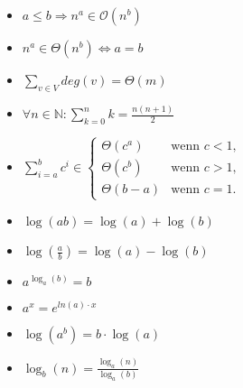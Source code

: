 \documentclass[11pt, a4paper, twoside]{article}
\begin{document}
\begin{multicols}{3}
    \begin{itemize}
        \item $a \leq b \Rightarrow n^a \in \mathcal{O}(n^b)$
        \item $n^a \in \Theta(n^b) \Leftrightarrow a = b$
        \item $\sum_{v \in V}deg(v) = \Theta(m)$
        \item $\forall n \in \mathbb{N}: \sum^n_{k=0}k = \frac{n(n+1)}{2}$
        \item $
            \sum^b_{i=a}c^i \in \begin{cases}
                \Theta(c^a) &\text{wenn } c < 1, \\
                \Theta(c^b) &\text{wenn } c > 1, \\
                \Theta(b-a) &\text{wenn } c = 1.
            \end{cases}
            $
        \item $\log(ab) = \log(a) + \log(b)$
        \item $\log(\frac{a}{b}) = \log(a) - \log(b)$
        \item $a^{\log_a(b)} = b$
        \item $a^x = e^{ln(a) \cdot x}$
        \item $\log(a^b) = b \cdot \log(a)$
        \item $\log_b(n) = \frac{\log_a(n)}{\log_a(b)}$
    \end{itemize}



\end{multicols}
\end{document}

